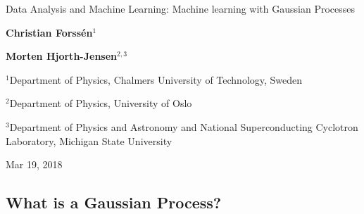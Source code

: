 \documentclass[%
oneside,                 %
final,                   %
10pt]{article}
\begin{document}

\newcommand{\exercisesection}[1]{\subsection*{#1}}






\thispagestyle{empty}

\begin{center}
{\LARGE\bf
\begin{spacing}{1.25}
Data Analysis and Machine Learning: Machine learning with Gaussian Processes
\end{spacing}
}
\end{center}


\begin{center}
{\bf Christian Forssén${}^{1}$} \\ [0mm]
\end{center}


\begin{center}
{\bf Morten Hjorth-Jensen${}^{2, 3}$} \\ [0mm]
\end{center}

\begin{center}
\centerline{{\small ${}^1$Department of Physics, Chalmers University of Technology, Sweden}}
\centerline{{\small ${}^2$Department of Physics, University of Oslo}}
\centerline{{\small ${}^3$Department of Physics and Astronomy and National Superconducting Cyclotron Laboratory, Michigan State University}}
\end{center}
    

\begin{center}
Mar 19, 2018
\end{center}

\vspace{1cm}


\subsection*{What is a Gaussian Process?}
\end{document}
